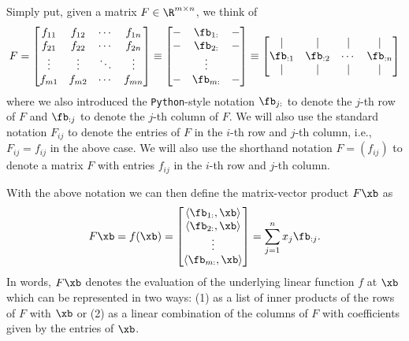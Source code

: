 Simply put, given a matrix $F \in \R^{m \times n}$, we think of  
\begin{equation*}
    F = \begin{bmatrix}
        f_{11} & f_{12} & \cdots & f_{1n} \\
        f_{21} & f_{22} & \cdots & f_{2n} \\
        \vdots & \vdots & \ddots & \vdots \\
        f_{m1} & f_{m2} & \cdots & f_{mn}
    \end{bmatrix} 
    \equiv 
    \begin{bmatrix}
        -  & \fb_{1:} &  - \\
        -  & \fb_{2:} &  - \\
         & \vdots &  \\
        -  & \fb_{m:} &  -
    \end{bmatrix} 
    \equiv 
    \begin{bmatrix}
        |        & |        &  |  &      | \\
        \fb_{:1} & \fb_{:2} & \cdots & \fb_{:n} \\
                |        & |        &  |  &      |   
    \end{bmatrix}
\end{equation*}
where we also introduced the \texttt{Python}-style notation $\fb_{j:}$ to 
denote the $j$-th row of $F$ and $\fb_{:j}$ to denote the $j$-th column of $F$.
We will also use the standard notation $F_{ij}$ to denote the 
entries of $F$ in the $i$-th row and $j$-th column, i.e., $F_{ij} = f_{ij}$ in the above 
case. We will also use the shorthand notation $F = (f_{ij})$ to denote a matrix $F$ with entries $f_{ij}$ in the $i$-th row and $j$-th column.

With the above notation we can then define the matrix-vector product $F \xb$ as
\begin{equation*}
    F \xb = f(\xb) = \begin{bmatrix}
        \langle \fb_{1:}, \xb \rangle \\
        \langle \fb_{2:}, \xb \rangle \\
        \vdots \\
        \langle \fb_{m:}, \xb \rangle  
    \end{bmatrix} 
    =  
    \sum_{j=1}^n x_j \fb_{:j}.
\end{equation*}
In words, $F \xb$ denotes the evaluation of the underlying linear function $f$ at 
$\xb$ which can be represented in two ways: (1) as a list of inner products of the rows of $F$ with $\xb$ or (2) as a linear combination of the columns of $F$ with coefficients given by the entries of $\xb$.

